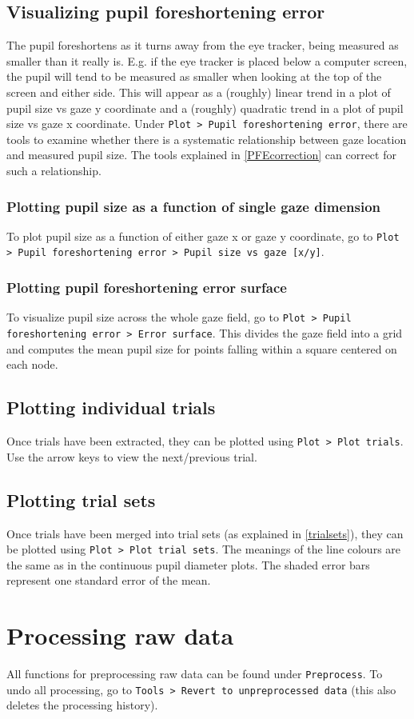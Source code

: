 \documentclass{article}
\begin{document}
\subsection{Visualizing pupil foreshortening error} \label{PFEplot}
The pupil foreshortens as it turns away from the eye tracker, being measured as smaller than it really is. E.g. if the eye tracker is placed below a computer screen, the pupil will tend to be measured as smaller when looking at the top of the screen and either side. This will appear as a (roughly) linear trend in a plot of pupil size vs gaze y coordinate and a (roughly) quadratic trend in a plot of pupil size vs gaze x coordinate. Under \texttt{Plot > Pupil foreshortening error}, there are tools to examine whether there is a systematic relationship between gaze location and measured pupil size. The tools explained in \ref{PFEcorrection} can correct for such a relationship.
\subsubsection{Plotting pupil size as a function of single gaze dimension}
To plot pupil size as a function of either gaze x or gaze y coordinate, go to \texttt{Plot > Pupil foreshortening error > Pupil size vs gaze [x/y]}.
\subsubsection{Plotting pupil foreshortening error surface}
To visualize pupil size across the whole gaze field, go to \texttt{Plot > Pupil foreshortening error > Error surface}. This divides the gaze field into a grid and computes the mean pupil size for points falling within a square centered on each node.
\subsection{Plotting individual trials}
Once trials have been extracted, they can be plotted using \texttt{Plot > Plot trials}. Use the arrow keys to view the next/previous trial.
\subsection{Plotting trial sets}
Once trials have been merged into trial sets (as explained in \ref{trialsets}), they can be plotted using \texttt{Plot > Plot trial sets}. The meanings of the line colours are the same as in the continuous pupil diameter plots. The shaded error bars represent one standard error of the mean.
\section{Processing raw data}
All functions for preprocessing raw data can be found under \texttt{Preprocess}. To undo all processing, go to \texttt{Tools > Revert to unpreprocessed data} (this also deletes the processing history).
\end{document}
